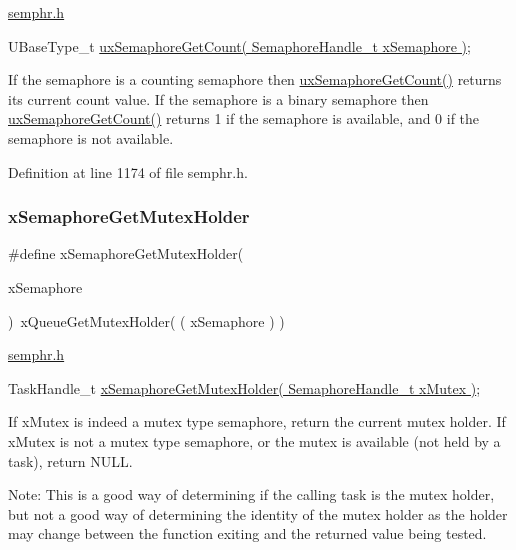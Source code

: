 \hyperlink{semphr_8h_source}{semphr.\+h} 
\begin{DoxyPre}UBaseType\_t \hyperlink{group___semaphores_gaa26a3d7cf9b5595a652daeb7f81229f3}{uxSemaphoreGetCount( SemaphoreHandle\_t xSemaphore )};\end{DoxyPre}


If the semaphore is a counting semaphore then \hyperlink{group___semaphores_gaa26a3d7cf9b5595a652daeb7f81229f3}{ux\+Semaphore\+Get\+Count()} returns its current count value. If the semaphore is a binary semaphore then \hyperlink{group___semaphores_gaa26a3d7cf9b5595a652daeb7f81229f3}{ux\+Semaphore\+Get\+Count()} returns 1 if the semaphore is available, and 0 if the semaphore is not available. 

Definition at line 1174 of file semphr.\+h.

\mbox{\label{group___semaphores_ga7403bfbc06fb8449b2334f55d939a4c4}} 
\subsubsection{\texorpdfstring{x\+Semaphore\+Get\+Mutex\+Holder}{xSemaphoreGetMutexHolder}}
{\footnotesize\ttfamily \#define x\+Semaphore\+Get\+Mutex\+Holder(\begin{DoxyParamCaption}\item[{}]{x\+Semaphore }\end{DoxyParamCaption})~x\+Queue\+Get\+Mutex\+Holder( ( x\+Semaphore ) )}

\hyperlink{semphr_8h_source}{semphr.\+h} 
\begin{DoxyPre}TaskHandle\_t \hyperlink{group___semaphores_ga7403bfbc06fb8449b2334f55d939a4c4}{xSemaphoreGetMutexHolder( SemaphoreHandle\_t xMutex )};\end{DoxyPre}


If x\+Mutex is indeed a mutex type semaphore, return the current mutex holder. If x\+Mutex is not a mutex type semaphore, or the mutex is available (not held by a task), return N\+U\+LL.

Note\+: This is a good way of determining if the calling task is the mutex holder, but not a good way of determining the identity of the mutex holder as the holder may change between the function exiting and the returned value being tested. 

